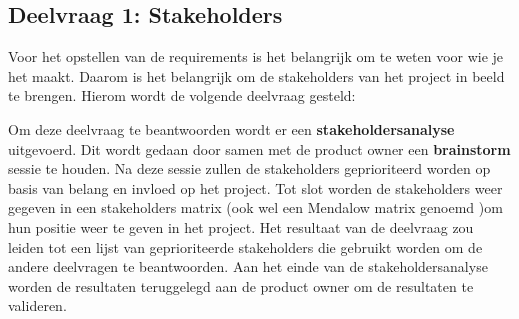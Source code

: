 \subsection{Deelvraag 1: Stakeholders}
Voor het opstellen van de requirements is het belangrijk om te weten voor wie je het maakt.
Daarom is het belangrijk om de stakeholders van het project in beeld te brengen.
Hierom wordt de volgende deelvraag gesteld:

\begin{center}
	\textit{\SubquestionOne}
\end{center}

\whitespace[0.2]
Om deze deelvraag te beantwoorden wordt er een \textbf{stakeholdersanalyse} uitgevoerd.
Dit wordt gedaan door samen met de product owner een \textbf{brainstorm} sessie te houden.
Na deze sessie zullen de stakeholders geprioriteerd worden op basis van belang en invloed op het project.
Tot slot worden de stakeholders weer gegeven in een stakeholders matrix (ook wel een Mendalow matrix genoemd \Parencite{MandelowMatrix})om hun positie weer te geven in het project.
Het resultaat van de deelvraag zou leiden tot een lijst van geprioriteerde stakeholders die gebruikt worden om de andere deelvragen te beantwoorden.
Aan het einde van de stakeholdersanalyse worden de resultaten teruggelegd aan de product owner om de resultaten te valideren.

